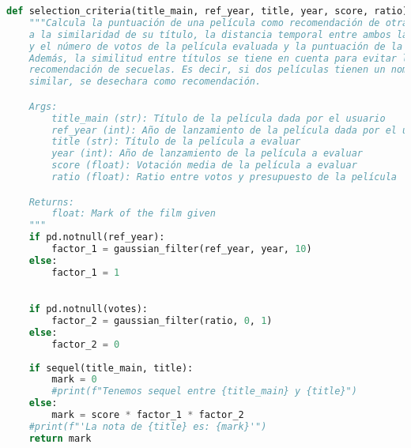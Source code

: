 \begin{lstlisting}[language=Python, caption=Criterios de selección para la elección de las mejores películas., label={lst:criteria}]
def selection_criteria(title_main, ref_year, title, year, score, ratio):
    """Calcula la puntuación de una película como recomendación de otra en base 
    a la similaridad de su título, la distancia temporal entre ambos lanzamientos
    y el número de votos de la película evaluada y la puntuación de la película.
    Además, la similitud entre títulos se tiene en cuenta para evitar la 
    recomendación de secuelas. Es decir, si dos películas tienen un nombre muy 
    similar, se desechara como recomendación.

    Args:
        title_main (str): Título de la película dada por el usuario
        ref_year (int): Año de lanzamiento de la película dada por el usuario
        title (str): Título de la película a evaluar
        year (int): Año de lanzamiento de la película a evaluar
        score (float): Votación media de la película a evaluar
        ratio (float): Ratio entre votos y presupuesto de la película

    Returns:
        float: Mark of the film given
    """
    if pd.notnull(ref_year):
        factor_1 = gaussian_filter(ref_year, year, 10)
    else:
        factor_1 = 1        

        
    if pd.notnull(votes):
        factor_2 = gaussian_filter(ratio, 0, 1)
    else:
        factor_2 = 0
        
    if sequel(title_main, title):
        mark = 0
        #print(f"Tenemos sequel entre {title_main} y {title}")
    else:
        mark = score * factor_1 * factor_2
    #print(f"'La nota de {title} es: {mark}'")
    return mark
\end{lstlisting}

